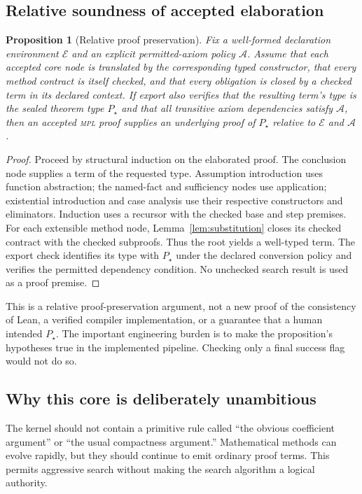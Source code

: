 \documentclass[11pt,a4paper]{article}
\newcommand{\MPL}{\textnormal{\textsc{mpl}}}
\newcommand{\Env}{\mathcal E}
\newcommand{\Pol}{\mathcal A}
\newtheorem{proposition}{Proposition}[section]
\theoremstyle{remark}
\begin{document}
\subsection{Relative soundness of accepted elaboration}

\begin{proposition}[Relative proof preservation]
\label{prop:soundness}
Fix a well-formed declaration environment $\Env$ and an explicit permitted-axiom policy $\Pol$. Assume that each accepted core node is translated by the corresponding typed constructor, that every method contract is itself checked, and that every obligation is closed by a checked term in its declared context. If export also verifies that the resulting term's type is the sealed theorem type $P_\star$ and that all transitive axiom dependencies satisfy $\Pol$, then an accepted \MPL{} proof supplies an underlying proof of $P_\star$ relative to $\Env$ and $\Pol$.
\end{proposition}
\begin{proof}
Proceed by structural induction on the elaborated proof. The conclusion node supplies a term of the requested type. Assumption introduction uses function abstraction; the named-fact and sufficiency nodes use application; existential introduction and case analysis use their respective constructors and eliminators. Induction uses a recursor with the checked base and step premises. For each extensible method node, Lemma~\ref{lem:substitution} closes its checked contract with the checked subproofs. Thus the root yields a well-typed term. The export check identifies its type with $P_\star$ under the declared conversion policy and verifies the permitted dependency condition. No unchecked search result is used as a proof premise.
\end{proof}

This is a relative proof-preservation argument, not a new proof of the consistency of Lean, a verified compiler implementation, or a guarantee that a human intended $P_\star$. The important engineering burden is to make the proposition's hypotheses true in the implemented pipeline. Checking only a final success flag would not do so.

\subsection{Why this core is deliberately unambitious}

The kernel should not contain a primitive rule called ``the obvious coefficient argument'' or ``the usual compactness argument.'' Mathematical methods can evolve rapidly, but they should continue to emit ordinary proof terms. This permits aggressive search without making the search algorithm a logical authority.
\end{document}
